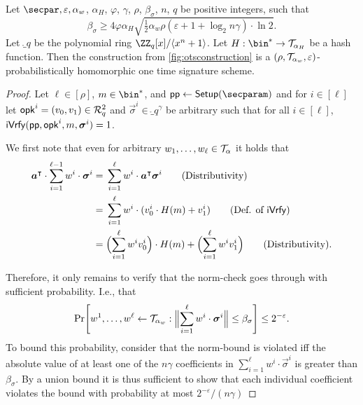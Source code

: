 \begin{lemma}\label{lem:kots_correct}
Let $\secpar, \varepsilon, \alpha_w$, $\alpha_H$, $\varphi$, $\gamma$, $\rho$, $\beta_\sigma$, $n$, $q$ be positive integers, such that \[\beta_\sigma \geq 4\varphi\alpha_H\sqrt{\tfrac{1}{2}\alpha_w\rho(\varepsilon+1+\log_2n\gamma)\cdot\ln2}.\]
  Let $\ring_q$ be the polynomial ring $\ZZ_q[x]/\langle x^n+1\rangle$.
  Let $H : \bin^* \to \tern_{\alpha_H}$ be a hash function.
  Then the construction from \autoref{fig:otsconstruction} is a $(\rho,\mathcal{T}_{\alpha_w},\varepsilon)$-probabilistically homomorphic one time signature scheme.
\end{lemma}

\begin{proof}
  Let $\ell\in[\rho]$, $m\in\bin^*$, and $\params\gets\setup(\secparam)$ and for $i\in[\ell]$ let $\mathsf{opk}^i=(v_0,v_1) \in \mathcal{R}_q^2$ and $\vec{\sigma}^i \in \ring_q^\gamma$ be arbitrary such that for all $i\in[\ell]$, $\mathsf{iVrfy}(\mathsf{pp},\mathsf{opk}^i,m,\boldsymbol{\sigma}^i)=1$.
  
  We first note that even for arbitrary $w_1,\dots,w_\ell \in \mathcal{T}_\alpha$ it holds that
  \begin{align*}
    \vec{a}^\intercal\cdot \sum_{i=1}^{\ell-1}w^i\cdot\vec{\sigma}^i
    ={}&\sum_{i=1}^{\ell}w^i\cdot\vec{a}^\intercal\vec{\sigma}^i \tag{Distributivity}\\
    ={}&\sum_{i=1}^{\ell}w^i\cdot(v^i_0\cdot H(m)+v^i_1) \tag{Def. of $\iverify$}\\
    ={}&\Bigl(\sum_{i=1}^{\ell}w^iv^i_0\Bigr)\cdot H(m)+ \Bigl(\sum_{i=1}^{\ell}w^iv^i_1\Bigr) \tag{Distributivity}.
  \end{align*}
  
  Therefore, it only remains to verify that the norm-check goes through with sufficient probability.
  I.e., that
  \[
    \Pr\mleft[
      w^1,\dots,w^\ell\gets \tern_{\alpha_w}
      :
      \Bigl\Vert\sum_{i=1}^{\ell} w^i\cdot\vec{\sigma}^i\Bigr\Vert \leq \beta_\sigma\mright] \leq 2^{-\varepsilon}.
  \]
  To bound this probability, consider that the norm-bound is violated iff the absolute value of at least one of the $n\gamma$ coefficients in $\sum_{i=1}^{\ell} w^i\cdot\vec{\sigma}^i$ is greater than $\beta_\sigma$.
  By a union bound it is thus sufficient to show that each individual coefficient violates the bound with probability at most $2^{-\varepsilon}/(n\gamma)$
  

\end{proof}
